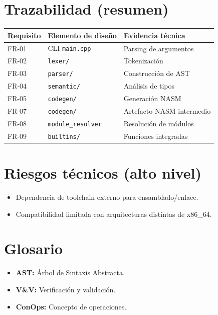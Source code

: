 \documentclass[11pt,a4paper]{article}
\begin{document}
\section{Trazabilidad (resumen)}
\begin{longtable}{@{}p{3cm}p{5cm}p{6cm}@{}}
\toprule
\textbf{Requisito} & \textbf{Elemento de diseño} & \textbf{Evidencia técnica} \\ \midrule
FR-01 & CLI \texttt{main.cpp} & Parsing de argumentos \\
FR-02 & \texttt{lexer/} & Tokenización \\
FR-03 & \texttt{parser/} & Construcción de AST \\
FR-04 & \texttt{semantic/} & Análisis de tipos \\
FR-05 & \texttt{codegen/} & Generación NASM \\
FR-07 & \texttt{codegen/} & Artefacto NASM intermedio \\
FR-08 & \texttt{module\_resolver} & Resolución de módulos \\
FR-09 & \texttt{builtins/} & Funciones integradas \\ \bottomrule
\end{longtable}

\section{Riesgos técnicos (alto nivel)}
\begin{itemize}
    \item Dependencia de toolchain externo para ensamblado/enlace.
    \item Compatibilidad limitada con arquitecturas distintas de x86\_64.
\end{itemize}

\section{Glosario}
\begin{itemize}
    \item \textbf{AST:} Árbol de Sintaxis Abstracta.
    \item \textbf{V\&V:} Verificación y validación.
    \item \textbf{ConOps:} Concepto de operaciones.
\end{itemize}
\end{document}
